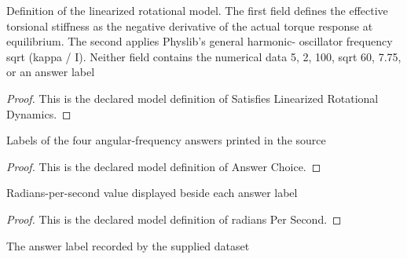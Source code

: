 \begin{definition}
  \label{def:physics:phyx-mini-0232:phyxminiproblems-problemphyxmini0232-satisfieslinearizedrotationaldynamics}
  Definition of the linearized rotational model. The first field defines the effective torsional stiffness as the negative derivative of the actual torque response at equilibrium. The second applies Physlib's general harmonic- oscillator frequency sqrt (kappa / I). Neither field contains the numerical data 5, 2, 100, sqrt 60, 7.75, or an answer label
\end{definition}
\begin{proof}
  This is the declared model definition of Satisfies Linearized Rotational Dynamics.
\end{proof}
\begin{definition}
  \label{def:physics:phyx-mini-0232:phyxminiproblems-problemphyxmini0232-answerchoice}
  Labels of the four angular-frequency answers printed in the source
\end{definition}
\begin{proof}
  This is the declared model definition of Answer Choice.
\end{proof}
\begin{definition}
  \label{def:physics:phyx-mini-0232:phyxminiproblems-problemphyxmini0232-answerchoice-radianspersecond}
  Radians-per-second value displayed beside each answer label
\end{definition}
\begin{proof}
  This is the declared model definition of radians Per Second.
\end{proof}
\begin{definition}
  \label{def:physics:phyx-mini-0232:phyxminiproblems-problemphyxmini0232-recordedanswerchoice}
  The answer label recorded by the supplied dataset
\end{definition}
